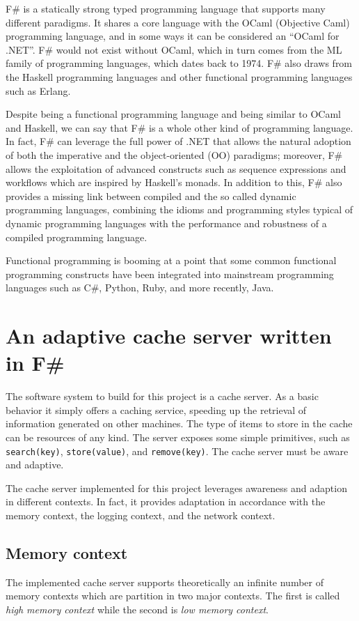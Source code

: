 \documentclass[11pt,a4paper]{article}
\begin{document}
F\# is a statically strong typed programming language that supports many different paradigms. It shares a core language with the OCaml (Objective Caml) programming language, and in some ways it can be considered an ``OCaml for .NET''. F\# would not exist without OCaml, which in turn comes from the ML family of programming languages, which dates back to 1974. F\# also draws from the Haskell programming languages and other functional programming languages such as Erlang.

Despite being a functional programming language and being similar to OCaml and Haskell, we can say that F\# is a whole other kind of programming language. In fact, F\# can leverage the full power of .NET that allows the natural adoption of both the imperative and the object-oriented (OO) paradigms; moreover, F\# allows the exploitation of advanced constructs such as sequence expressions and workflows which are inspired by Haskell's monads. In addition to this, F\# also provides a missing link between compiled and the so called dynamic programming languages, combining the idioms and programming styles typical of dynamic programming languages with the performance and robustness of a compiled programming language.

Functional programming is booming at a point that some common functional programming constructs have been integrated into mainstream programming languages such as C\#, Python, Ruby, and more recently, Java.

\section{An adaptive cache server written in F\#}
\label{section:work}
The software system to build for this project is a cache server. As a basic behavior it simply offers a caching service, speeding up the retrieval of information generated on other machines. The type of items to store in the cache can be resources of any kind. The server exposes some simple primitives, such as \texttt{search(key)}, \texttt{store(value)}, and \texttt{remove(key)}. The cache server must be aware and adaptive.

The cache server implemented for this project leverages awareness and adaption in different contexts. In fact, it provides adaptation in accordance with the memory context, the logging context, and the network context.

\subsection{Memory context}
\label{section:work:memory-context}
The implemented cache server supports theoretically an infinite number of memory contexts which are partition in two major contexts. The first is called \emph{high memory context} while the second is \emph{low memory context}.
\end{document}
